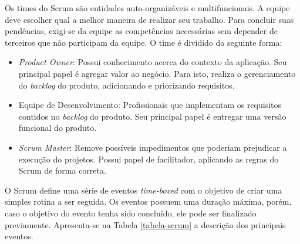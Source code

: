 Os times do Scrum são entidades auto-organizáveis e multifuncionais. A equipe deve escolher qual a melhor maneira de realizar seu trabalho. Para concluir suas pendências, exigi-se da equipe as competências necessárias sem depender de terceiros que não participam da equipe. O time é dividido da seguinte forma:

\begin{itemize}
\item \textit{Product Owner}: Possui conhecimento acerca do contexto da aplicação. Seu principal papel é agregar valor ao negócio. Para isto, realiza o gerenciamento do \textit{backlog} do produto, adicionando e priorizando requisitos.
\item Equipe de Desenvolvimento: Profissionais que implementam os requisitos contidos no \textit{backlog} do produto. Seu principal papel é entregar uma versão funcional do produto.
\item \textit{Scrum Master}: Remove possíveis impedimentos que poderiam prejudicar a execução do projetos. Possui papel de facilitador, aplicando as regras do Scrum de forma correta.  
\end{itemize}

O Scrum define uma série de eventos \textit{time-boxed} com o objetivo de criar uma simples rotina a ser seguida. Os eventos possuem uma duração máxima, porém, caso o objetivo do evento tenha sido concluído, ele pode ser finalizado previamente. Apresenta-se na Tabela \ref{tabela-scrum} a descrição dos principais eventos.

